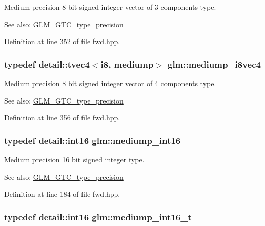 Medium precision 8 bit signed integer vector of 3 components type. \begin{Desc}
\item[See also:]\hyperlink{group__gtc__type__precision}{GLM\_\-GTC\_\-type\_\-precision} \end{Desc}


Definition at line 352 of file fwd.hpp.\hypertarget{group__gtc__type__precision_gd41bf4bfa504dc1191623ff77151d01f}{
\subsubsection[mediump\_\-i8vec4]{\setlength{\rightskip}{0pt plus 5cm}typedef detail::tvec4$<$i8, mediump$>$ {\bf glm::mediump\_\-i8vec4}}}
\label{group__gtc__type__precision_gd41bf4bfa504dc1191623ff77151d01f}


Medium precision 8 bit signed integer vector of 4 components type. \begin{Desc}
\item[See also:]\hyperlink{group__gtc__type__precision}{GLM\_\-GTC\_\-type\_\-precision} \end{Desc}


Definition at line 356 of file fwd.hpp.\hypertarget{group__gtc__type__precision_g4611997edb6c61606daa11990cf08798}{
\subsubsection[mediump\_\-int16]{\setlength{\rightskip}{0pt plus 5cm}typedef detail::int16 {\bf glm::mediump\_\-int16}}}
\label{group__gtc__type__precision_g4611997edb6c61606daa11990cf08798}


Medium precision 16 bit signed integer type. \begin{Desc}
\item[See also:]\hyperlink{group__gtc__type__precision}{GLM\_\-GTC\_\-type\_\-precision} \end{Desc}


Definition at line 184 of file fwd.hpp.\hypertarget{group__gtc__type__precision_g478fab608cf43040013d719a3e03b194}{
\subsubsection[mediump\_\-int16\_\-t]{\setlength{\rightskip}{0pt plus 5cm}typedef detail::int16 {\bf glm::mediump\_\-int16\_\-t}}}
\label{group__gtc__type__precision_g478fab608cf43040013d719a3e03b194}


